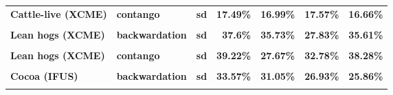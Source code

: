 \documentclass[
  authoryear,
  preprint,
  3p]{elsarticle}
\begin{document}
\begin{longtable}[t]{>{}l>{}l>{}l>{}r>{}r>{}r>{}r}
\textbf{Cattle-live (XCME)} & \textbf{contango} & \textbf{sd} & \textcolor[HTML]{4285f4}{\textbf{17.49\%}} & \textcolor[HTML]{4285f4}{\textbf{16.99\%}} & \textcolor[HTML]{4285f4}{\textbf{17.57\%}} & \textcolor[HTML]{4285f4}{\textbf{16.66\%}}\\
\textbf{\cellcolor{gray!10}{Lean hogs (XCME)}} & \textbf{\cellcolor{gray!10}{backwardation}} & \textbf{\cellcolor{gray!10}{mean}} & \textcolor[HTML]{4285f4}{\textbf{\cellcolor{gray!10}{12.34\%}}} & \textcolor[HTML]{4285f4}{\textbf{\cellcolor{gray!10}{16.3\%}}} & \textcolor[HTML]{4285f4}{\textbf{\cellcolor{gray!10}{18.23\%}}} & \textcolor[HTML]{4285f4}{\textbf{\cellcolor{gray!10}{19.24\%}}}\\
\textbf{Lean hogs (XCME)} & \textbf{backwardation} & \textbf{sd} & \textcolor[HTML]{4285f4}{\textbf{37.6\%}} & \textcolor[HTML]{4285f4}{\textbf{35.73\%}} & \textcolor[HTML]{4285f4}{\textbf{27.83\%}} & \textcolor[HTML]{4285f4}{\textbf{35.61\%}}\\
\textbf{\cellcolor{gray!10}{Lean hogs (XCME)}} & \textbf{\cellcolor{gray!10}{contango}} & \textbf{\cellcolor{gray!10}{mean}} & \textcolor[HTML]{4285f4}{\textbf{\cellcolor{gray!10}{-10.5\%}}} & \textcolor[HTML]{4285f4}{\textbf{\cellcolor{gray!10}{0.6\%}}} & \textcolor[HTML]{4285f4}{\textbf{\cellcolor{gray!10}{7.5\%}}} & \textcolor[HTML]{4285f4}{\textbf{\cellcolor{gray!10}{-20.66\%}}}\\
\addlinespace
\textbf{Lean hogs (XCME)} & \textbf{contango} & \textbf{sd} & \textcolor[HTML]{4285f4}{\textbf{39.22\%}} & \textcolor[HTML]{4285f4}{\textbf{27.67\%}} & \textcolor[HTML]{4285f4}{\textbf{32.78\%}} & \textcolor[HTML]{4285f4}{\textbf{38.28\%}}\\
\textbf{\cellcolor{gray!10}{Cocoa (IFUS)}} & \textbf{\cellcolor{gray!10}{backwardation}} & \textbf{\cellcolor{gray!10}{mean}} & \textcolor[HTML]{4285f4}{\textbf{\cellcolor{gray!10}{4.12\%}}} & \textcolor[HTML]{4285f4}{\textbf{\cellcolor{gray!10}{9.25\%}}} & \textcolor[HTML]{4285f4}{\textbf{\cellcolor{gray!10}{-9.56\%}}} & \textcolor[HTML]{4285f4}{\textbf{\cellcolor{gray!10}{-2.98\%}}}\\
\textbf{Cocoa (IFUS)} & \textbf{backwardation} & \textbf{sd} & \textcolor[HTML]{4285f4}{\textbf{33.57\%}} & \textcolor[HTML]{4285f4}{\textbf{31.05\%}} & \textcolor[HTML]{4285f4}{\textbf{26.93\%}} & \textcolor[HTML]{4285f4}{\textbf{25.86\%}}\\
\textbf{\cellcolor{gray!10}{Cocoa (IFUS)}} & \textbf{\cellcolor{gray!10}{contango}} & \textbf{\cellcolor{gray!10}{mean}} & \textcolor[HTML]{4285f4}{\textbf{\cellcolor{gray!10}{3.67\%}}} & \textcolor[HTML]{4285f4}{\textbf{\cellcolor{gray!10}{23.43\%}}} & \textcolor[HTML]{4285f4}{\textbf{\cellcolor{gray!10}{12.92\%}}} & \textcolor[HTML]{4285f4}{\textbf{\cellcolor{gray!10}{10.29\%}}}\\

\end{longtable}
\end{document}
